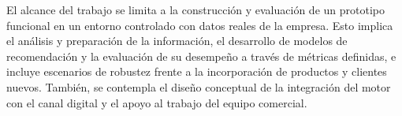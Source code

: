 El alcance del trabajo se limita a la construcción y evaluación de un prototipo funcional en un entorno controlado con datos reales de la empresa. Esto implica el análisis y preparación de la información, el desarrollo de modelos de recomendación y la evaluación de su desempeño a través de métricas definidas, e incluye escenarios de robustez frente a la incorporación de productos y clientes nuevos. También, se contempla el diseño conceptual de la integración del motor con el canal digital y el apoyo al trabajo del equipo comercial.








